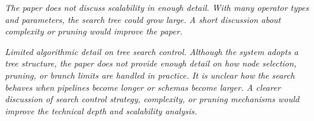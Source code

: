 % 






\begin{shaded}
{
\emph{The paper does not discuss scalability in enough detail. With many operator types and parameters, the search tree could grow large. A short discussion about complexity or pruning would improve the paper.}

\emph{Limited algorithmic detail on tree search control.
Although the system adopts a tree structure, the paper does not provide enough detail on how node selection, pruning, or branch limits are handled in practice. It is unclear how the search behaves when pipelines become longer or schemas become larger. A clearer discussion of search control strategy, complexity, or pruning mechanisms would improve the technical depth and scalability analysis.}
}
\end{shaded}

